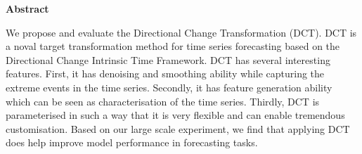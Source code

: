 \begin{center}

    \vspace*{2cm}

    {\textbf{Abstract}}

    \vspace*{1cm}

\end{center}

\begin{doublespace}
    We propose and evaluate the Directional Change Transformation (DCT). DCT is a noval target transformation method for time series forecasting based on the Directional Change Intrinsic Time Framework. DCT has several interesting features. First, it has denoising and smoothing ability while capturing the extreme events in the time series. Secondly, it has feature generation ability which can be seen as characterisation of the time series. Thirdly, DCT is parameterised in such a way that it is very flexible and can enable tremendous customisation. Based on our large scale experiment, we find that applying DCT does help improve model performance in forecasting tasks.
\end{doublespace}

\newpage
